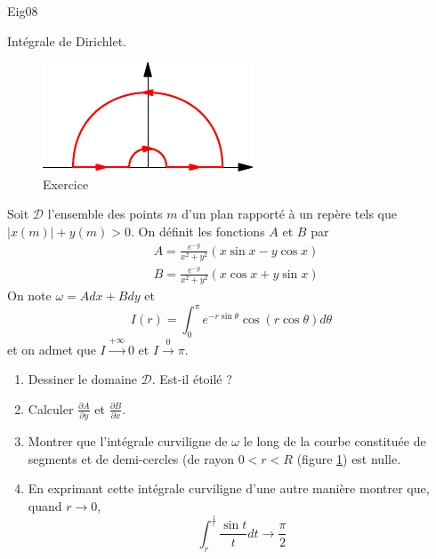 \begin{tiny}Eig08\end{tiny} Intégrale de Dirichlet.\newline
\begin{figure}[h!]
 \centering
 \includegraphics{./Eig08_1.pdf}
 \caption{Exercice }
 \label{fig:Eig08_1}
\end{figure}
Soit $\mathcal{D}$ l'ensemble des points $m$ d'un plan rapporté à un repère tels que $|x(m)|+y(m)>0$. On définit les fonctions $A$ et $B$ par
\begin{align*}
 &A= \frac{e^{-y}}{x^2+y^2}\left( x\sin x - y\cos x\right) \\
 &B= \frac{e^{-y}}{x^2+y^2}\left( x\cos x + y\sin x\right)
\end{align*}
On note $\omega = Adx +Bdy$ et
\begin{displaymath}
 I(r) = \int_0^\pi e^{-r\sin \theta}\cos(r\cos\theta)d\theta
\end{displaymath}
et on admet que $I \xrightarrow{+\infty}0$ et $I \xrightarrow{0}\pi$.
\begin{enumerate}
 \item Dessiner le domaine $\mathcal{D}$. Est-il étoilé ?
 \item Calculer $\frac{\partial A}{\partial y}$ et $\frac{\partial B}{\partial x}$.
 \item Montrer que l'intégrale curviligne de $\omega$ le long de la courbe constituée de segments et de demi-cercles (de rayon $0<r<R$ (figure \ref{fig:Eig08_1}) est nulle.
 \item En exprimant cette intégrale curviligne d'une autre manière montrer que, quand $r\rightarrow 0$,
\begin{displaymath}
 \int_r^{\frac{1}{r}}\frac{\sin t}{t}dt \rightarrow \frac{\pi}{2}
\end{displaymath}

\end{enumerate}
